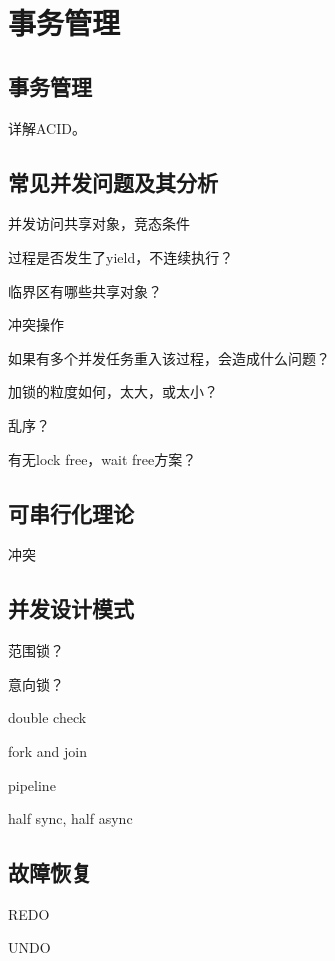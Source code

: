 \chapter{事务管理}

\section{事务管理}

详解ACID。

\section{常见并发问题及其分析}

并发访问共享对象，竞态条件

\begin{enumbox}
\item 过程是否发生了yield，不连续执行？
\item 临界区有哪些共享对象？
\item 冲突操作
\item 如果有多个并发任务重入该过程，会造成什么问题？
\item 加锁的粒度如何，太大，或太小？
\item 乱序？
\item 有无lock free，wait free方案？
\end{enumbox}

\section{可串行化理论}

冲突

\section{并发设计模式}

范围锁？

意向锁？

\begin{compactitem}
    \item double check
    \item fork and join
    \item pipeline
    \item half sync, half async
\end{compactitem}

\section{故障恢复}

REDO

UNDO
